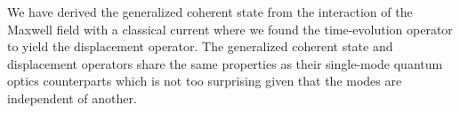 We have derived the generalized coherent state from the interaction of the Maxwell field with a classical current where we found the time-evolution operator to yield the displacement operator.
The generalized coherent state and displacement operators share the same properties as their single-mode quantum optics counterparts which is not too surprising given that the modes are independent of another.